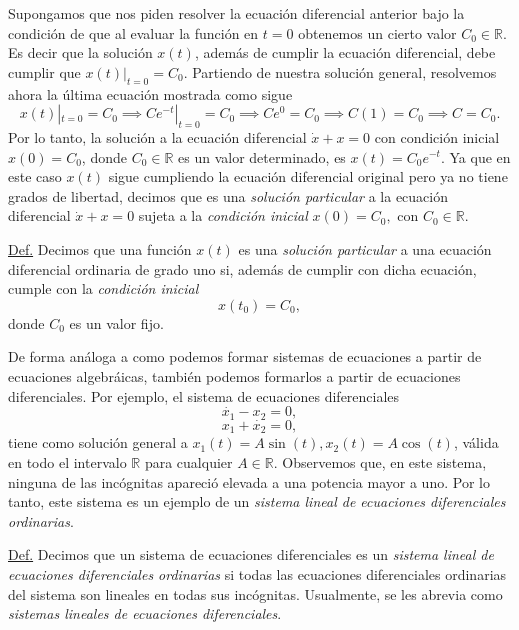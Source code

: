 \documentclass[12pt,dvipsnames]{article}
\begin{document}
\vspace{3mm}
Supongamos que nos piden resolver la ecuación diferencial anterior bajo la condición de que al evaluar la función en $t=0$ obtenemos un cierto valor $C_0\in\mathbb{R}$. Es decir que la solución $x(t)$, además de cumplir la ecuación diferencial, debe cumplir que $x(t)|_{t=0}=C_0.$ Partiendo de nuestra solución general, resolvemos ahora la última ecuación mostrada como sigue $$x(t)|_{t=0}=C_0\implies C e^{-t}|_{t=0}=C_0\implies C e^{0}=C_0\implies C(1)=C_0\implies C=C_0.$$ Por lo tanto, la solución a la ecuación diferencial $\dot{x}+x=0$ con condición inicial $x(0)=C_0$, donde $C_0\in\mathbb{R}$ es un valor determinado, es $x(t)=C_0 e^{-t}$. Ya que en este caso $x(t)$ sigue cumpliendo la ecuación diferencial original pero ya no tiene grados de libertad, decimos que es una \emph{solución particular} a la ecuación diferencial $\dot{x}+x=0$ sujeta a la \emph{condición inicial} $x(0)=C_0,$ con $C_0\in\mathbb{R}$.

\vspace{3mm}
\begin{tcolorbox}
\underline{Def.} Decimos que una función $x(t)$ es una \emph{solución particular} a una ecuación diferencial ordinaria de grado uno si, además de cumplir con dicha ecuación, cumple con la \emph{condición inicial} $$x(t_0)=C_0,$$ donde $C_0$ es un valor fijo.
\end{tcolorbox}

De forma análoga a como podemos formar sistemas de ecuaciones a partir de ecuaciones algebráicas, también podemos formarlos a partir de ecuaciones diferenciales. Por ejemplo, el sistema de ecuaciones diferenciales $$\dot{x_1} - x_2 = 0,$$ $$x_1 + \dot{x_2} = 0,$$ tiene como solución general a $x_1(t)=A\sin(t), x_2(t)=A\cos(t)$, válida en todo el intervalo $\mathbb{R}$ para cualquier $A\in\mathbb{R}$. Observemos que, en este sistema, ninguna de las incógnitas apareció elevada a una potencia mayor a uno. Por lo tanto, este sistema es un ejemplo de un \emph{sistema lineal de ecuaciones diferenciales ordinarias}.

\vspace{3mm}
\begin{tcolorbox}
\underline{Def.} Decimos que un sistema de ecuaciones diferenciales es un \emph{sistema lineal de ecuaciones diferenciales ordinarias} si todas las ecuaciones diferenciales ordinarias del sistema son lineales en todas sus incógnitas. Usualmente, se les abrevia como \emph{sistemas lineales de ecuaciones diferenciales}.
\end{tcolorbox}
\vspace{3mm}
\end{document}
